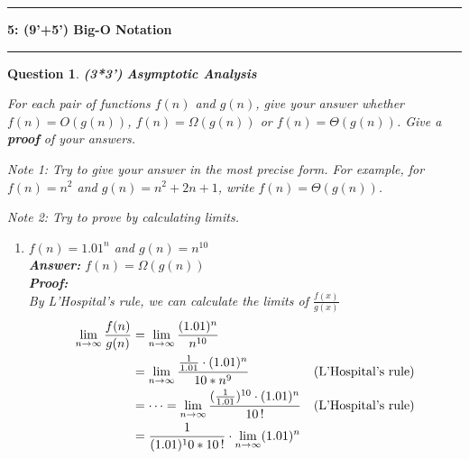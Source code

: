 \documentclass[10.5pt]{article}
\newcommand{\liminfty}{\lim_{n\to\infty}}
\newcommand\question[2]{\vspace{.25in}\hrule\textbf{#1: #2}\vspace{.5em}
\hrule\vspace{.10in}}
\newtheorem{Q}{Question}
\begin{document}
\question{5}{(9'+5') Big-O Notation}
\begin{Q}
 \textbf{(3*3')} \textbf{Asymptotic Analysis}
 
For each pair of functions $f(n)$ and $g(n)$, give your answer whether $f(n) = O(g(n))$, $f(n) = \Omega(g(n))$ or $f(n) = \Theta(g(n))$.  Give a \textbf{proof} of your answers. 
\vspace{0.1cm}

Note 1: Try to give your answer in the most precise form. For example, for $f(n) = n^2$ and $g(n) = n^2 + 2n + 1$, write $f(n) = \Theta(g(n))$. 

Note 2: Try to prove by calculating limits.


\begin{enumerate}
    \item $f(n) = {1.01}^n$ and $g(n) = n^{10}$\\
		\textup{\textbf{Answer: }}$f(n) = \Omega(g(n))$ \\
		\textup{\textbf{Proof: }}\\
    \textup{By L'Hospital's rule, we can calculate the limits of }$\frac{f(x)}{g(x)}$
		\begin{align*}
			\liminfty \frac{f(n)}{g(n)} & = \liminfty\frac{(1.01)^n}{n^{10}} &\\
			&=\liminfty \frac{\frac 1{1.01}\cdot (1.01)^n}{10 * n^9} &  \textup{(L'Hospital's rule)} \\
			&=\cdots= \liminfty\frac{(\frac1{1.01})^{10}\cdot(1.01)^n}{10\,!} & \textup{(L'Hospital's rule)}\\
			&=\frac{1}{(1.01)^10 * 10 \, !} \cdot \liminfty (1.01) ^ n
		\end{align*}


\end{enumerate}
\end{Q}
\end{document}
